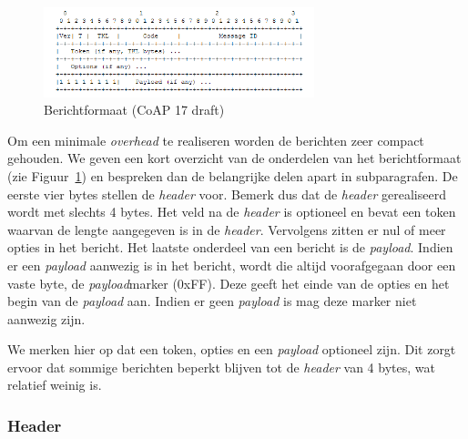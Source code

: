 \begin{figure}
\vspace{-20pt}
\includegraphics[width=0.7\textwidth]{fig/CoAPMessageFormat}
\vspace{-30pt}
\caption{Berichtformaat (CoAP 17 draft)}
\vspace{-10pt}
\label{fig:CoAPMessageFormat}
\end{figure}
Om een minimale \textit{overhead} te realiseren worden de berichten zeer compact gehouden. We geven een kort overzicht van de onderdelen van het berichtformaat (zie Figuur~\ref{fig:CoAPMessageFormat}) en bespreken dan de belangrijke delen apart in subparagrafen. De eerste vier bytes stellen de \textit{header} voor. Bemerk dus dat de \textit{header} gerealiseerd wordt met slechts 4 bytes. Het veld na de \textit{header} is optioneel en bevat een token waarvan de lengte aangegeven is in de \textit{header}. Vervolgens zitten er nul of meer opties in het bericht.
Het laatste onderdeel van een bericht is de \textit{payload}. Indien er een \textit{payload} aanwezig is in het bericht, wordt die altijd voorafgegaan door een vaste byte, de \textit{payload}marker (0xFF). Deze geeft het einde van de opties en het begin van de \textit{payload} aan. Indien er geen \textit{payload} is mag deze marker niet aanwezig zijn.

We merken hier op dat een token, opties en een \textit{payload} optioneel zijn. Dit zorgt ervoor dat sommige berichten beperkt blijven tot de \textit{header} van 4 bytes, wat relatief weinig is.

\subsubsection{Header}

